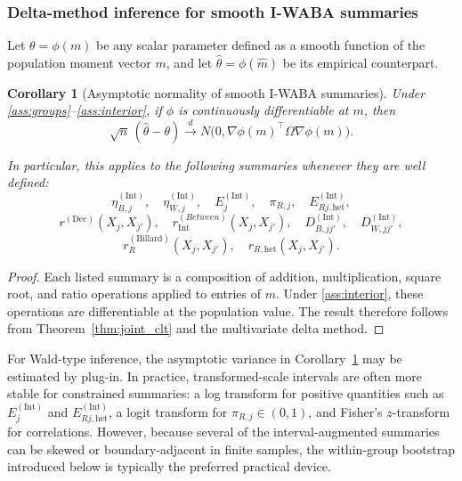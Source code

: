 \documentclass[preprint, times, 12pt, authoryear]{elsarticle}
\newtheorem{corollary}[theorem]{Corollary}
\begin{document}
\subsubsection{Delta-method inference for smooth I-WABA summaries}

Let $\theta=\phi(m)$ be any scalar parameter defined as a smooth function of the population moment vector $m$, and let $\hat\theta=\phi(\hat m)$ be its empirical counterpart.

\begin{corollary}[Asymptotic normality of smooth I-WABA summaries]\label{cor:delta_iwaba}
	Under \ref{ass:groups}--\ref{ass:interior}, if $\phi$ is continuously differentiable at $m$, then
	\[
	\sqrt{n}\,(\hat\theta-\theta)
	\xrightarrow{d}
	N\!\bigl(0,\nabla\phi(m)^\top \Omega \nabla\phi(m)\bigr).
	\]
	
	In particular, this applies to the following summaries whenever they are well defined:
	\[
	\eta_{B,j}^{(\mathrm{Int})},\quad
	\eta_{W,j}^{(\mathrm{Int})},\quad
	E_j^{(\mathrm{Int})},\quad
	\pi_{R,j},\quad
	E_{Rj,\mathrm{het}}^{(\mathrm{Int})},
	\]
	\[
	r^{(\mathrm{Dec})}(X_j,X_{j'}),\quad
	r_{\mathrm{Int}}^{(Between)}(X_j,X_{j'}),\quad
	D_{B,jj'}^{(\mathrm{Int})},\quad
	D_{W,jj'}^{(\mathrm{Int})},
	\]
	\[
	r_R^{(\mathrm{Billard})}(X_j,X_{j'}),\quad
	r_{R,\mathrm{het}}(X_j,X_{j'}).
	\]
\end{corollary}

\begin{proof}
	Each listed summary is a composition of addition, multiplication, square root, and ratio operations applied to entries of $m$. Under \ref{ass:interior}, these operations are differentiable at the population value. The result therefore follows from Theorem~\ref{thm:joint_clt} and the multivariate delta method.
\end{proof}

For Wald-type inference, the asymptotic variance in Corollary~\ref{cor:delta_iwaba} may be estimated by plug-in. In practice, transformed-scale intervals are often more stable for constrained summaries: a log transform for positive quantities such as $E_j^{(\mathrm{Int})}$ and $E_{Rj,\mathrm{het}}^{(\mathrm{Int})}$, a logit transform for $\pi_{R,j}\in(0,1)$, and Fisher's $z$-transform for correlations. However, because several of the interval-augmented summaries can be skewed or boundary-adjacent in finite samples, the within-group bootstrap introduced below is typically the preferred practical device.
\end{document}
